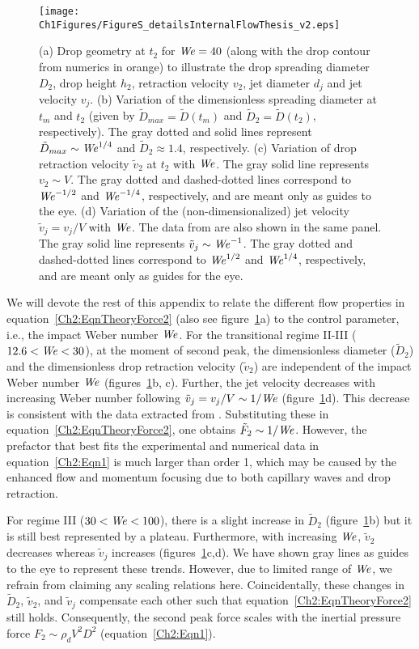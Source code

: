 \begin{subappendices}
	\begin{figure}
		\texttt{[image: Ch1Figures/FigureS\_detailsInternalFlowThesis\_v2.eps]}
		\caption{(a) Drop geometry at $t_2$ for $\mathit{We} = 40$ (along with the drop contour from numerics in orange) to illustrate the drop spreading diameter $D_2$, drop height $h_2$, retraction velocity $v_2$, jet diameter $d_j$ and jet velocity $v_j$. (b) Variation of the dimensionless spreading diameter at $t_m$ and $t_2$ (given by $\tilde D_{max} = \tilde D (t_m)  $ and $\tilde D_2 = \tilde D(t_2) $, respectively). The gray dotted and solid lines represent $\tilde D_{max} \sim \mathit{We}^{1/4}$ and $\tilde D_2 \approx 1.4$, respectively. (c) Variation of drop retraction velocity $\tilde{v}_2$ at $t_2$ with $\mathit{We}$. The gray solid line represents $v_2 \sim V$. The gray dotted and dashed-dotted lines correspond to $\mathit{We}^{-1/2}$ and $\mathit{We}^{-1/4}$, respectively,  and are meant only as guides to the eye. (d) Variation of the (non-dimensionalized) jet velocity $\tilde{v}_j = v_j/V$ with $\mathit{We}$. The data from \citet{bartolo2006singular} are also shown in the same panel. The gray solid line represents $\tilde{v}_j \sim \mathit{We}^{-1}$. The gray dotted and dashed-dotted lines correspond to $\mathit{We}^{1/2}$ and $\mathit{We}^{1/4}$, respectively, and are meant only as guides for the eye.}
		\label{Ch2:Fig_details}
	\end{figure}

	We will devote the rest of this appendix to relate the different flow properties in equation~\eqref{Ch2:EqnTheoryForce2} (also see figure~\ref{Ch2:Fig_details}a) to the control parameter, i.e., the impact Weber number $\mathit{We}$. For the transitional regime II-III ($12.6 < \mathit{We} < 30$), at the moment of second peak, the dimensionless diameter ($\tilde{D}_2$) and the dimensionless drop retraction velocity ($\tilde{v}_2$) are independent of the impact Weber number $\mathit{We}$ (figures~\ref{Ch2:Fig_details}b, c). Further, the jet velocity decreases with increasing Weber number following $\tilde{v}_j = v_j/V \sim 1/\mathit{We}$ (figure~\ref{Ch2:Fig_details}d). This decrease is consistent with the data extracted from \citet{bartolo2006singular}. Substituting these in equation~\eqref{Ch2:EqnTheoryForce2}, one obtains $\tilde{F}_2 \sim 1/\mathit{We}$. However, the prefactor that best fits the experimental and numerical data in equation~\eqref{Ch2:Eqn1} is much larger than order 1, which may be caused by the enhanced flow and momentum focusing due to both capillary waves and drop retraction.
	
	For regime III ($30 < \mathit{We} < 100$), there is a slight increase in $\tilde{D}_2$ (figure~\ref{Ch2:Fig_details}b) but it is still best represented by a plateau. Furthermore, with increasing $\mathit{We}$, $\tilde{v}_2$ decreases whereas $\tilde{v}_j$ increases (figures~\ref{Ch2:Fig_details}c,d). We have shown gray lines as guides to the eye to represent these trends. However, due to limited range of $\mathit{We}$, we refrain from claiming any scaling relations here. Coincidentally, these changes in $\tilde{D}_2$, $\tilde{v}_2$, and $\tilde{v}_j$ compensate each other such that equation~\eqref{Ch2:EqnTheoryForce2} still holds. Consequently, the second peak force scales with the inertial pressure force $F_2 \sim \rho_d V^2D^2$ (equation~\eqref{Ch2:Eqn1}).
	

\end{subappendices}
